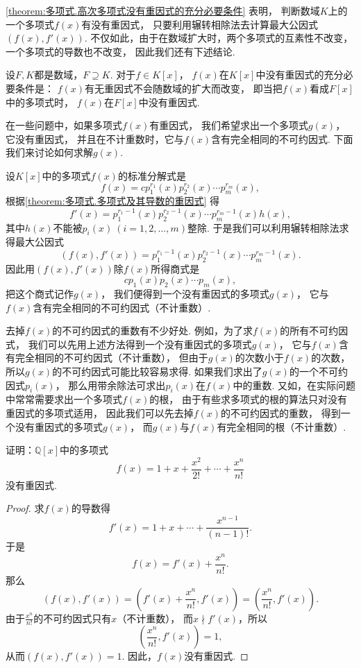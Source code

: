 \cref{theorem:多项式.高次多项式没有重因式的充分必要条件} 表明，
判断数域\(K\)上的一个多项式\(f(x)\)有没有重因式，
只要利用辗转相除法去计算最大公因式\((f(x),f'(x))\).
不仅如此，由于在数域扩大时，两个多项式的互素性不改变，一个多项式的导数也不改变，
因此我们还有下述结论.

\begin{proposition}
设\(F,K\)都是数域，\(F \supseteq K\).
对于\(f \in K[x]\)，
\(f(x)\)在\(K[x]\)中没有重因式的充分必要条件是：
\(f(x)\)有无重因式不会随数域的扩大而改变，
即当把\(f(x)\)看成\(F[x]\)中的多项式时，
\(f(x)\)在\(F[x]\)中没有重因式.
\end{proposition}

在一些问题中，如果多项式\(f(x)\)有重因式，
我们希望求出一个多项式\(g(x)\)，
它没有重因式，
并且在不计重数时，它与\(f(x)\)含有完全相同的不可约因式.
下面我们来讨论如何求解\(g(x)\).

设\(K[x]\)中的多项式\(f(x)\)的标准分解式是\[
	f(x) = c p_1^{r_1}(x) p_2^{r_2}(x) \dotsm p_m^{r_m}(x),
\]
根据\cref{theorem:多项式.多项式及其导数的重因式} 得\[
	f'(x) = p_1^{r_1-1}(x) p_2^{r_2-1}(x) \dotsm p_m^{r_m-1}(x) h(x),
\]
其中\(h(x)\)不能被\(p_i(x)\ (i=1,2,\dotsc,m)\)整除.
于是我们可以利用辗转相除法求得最大公因式\[
	(f(x),f'(x))
	= p_1^{r_1-1}(x) p_2^{r_2-1}(x) \dotsm p_m^{r_m-1}(x).
\]
因此用\((f(x),f'(x))\)除\(f(x)\)所得商式是\[
	c p_1(x) p_2(x) \dotsm p_m(x),
\]
把这个商式记作\(g(x)\)，
我们便得到一个没有重因式的多项式\(g(x)\)，
它与\(f(x)\)含有完全相同的不可约因式（不计重数）.

去掉\(f(x)\)的不可约因式的重数有不少好处.
例如，为了求\(f(x)\)的所有不可约因式，
我们可以先用上述方法得到一个没有重因式的多项式\(g(x)\)，
它与\(f(x)\)含有完全相同的不可约因式（不计重数），
但由于\(g(x)\)的次数小于\(f(x)\)的次数，
所以\(g(x)\)的不可约因式可能比较容易求得.
如果我们求出了\(g(x)\)的一个不可约因式\(p_i(x)\)，
那么用带余除法可求出\(p_i(x)\)在\(f(x)\)中的重数.
又如，在实际问题中常常需要求出一个多项式\(f(x)\)的根，
由于有些求多项式的根的算法只对没有重因式的多项式适用，
因此我们可以先去掉\(f(x)\)的不可约因式的重数，
得到一个没有重因式的多项式\(g(x)\)，
而\(g(x)\)与\(f(x)\)有完全相同的根（不计重数）.

\begin{example}
证明：\(\mathbb{Q}[x]\)中的多项式\[
	f(x) = 1+x+\frac{x^2}{2!}+\dotsb+\frac{x^n}{n!}
\]没有重因式.
\begin{proof}
求\(f(x)\)的导数得\[
	f'(x) = 1+x+\dotsm+\frac{x^{n-1}}{(n-1)!}.
\]
于是\[
	f(x) = f'(x) + \frac{x^n}{n!}.
\]
那么\[
	(f(x),f'(x))
	= \left(
		f'(x)+\frac{x^n}{n!},
		f'(x)
	\right)
	= \left(
		\frac{x^n}{n!},
		f'(x)
	\right).
\]
由于\(\frac{x^n}{n!}\)的不可约因式只有\(x\)（不计重数），
而\(x \nmid f'(x)\)，所以\[
	\left(
		\frac{x^n}{n!},
		f'(x)
	\right)
	= 1,
\]
从而\((f(x),f'(x))=1\).
因此，\(f(x)\)没有重因式.
\end{proof}
\end{example}
